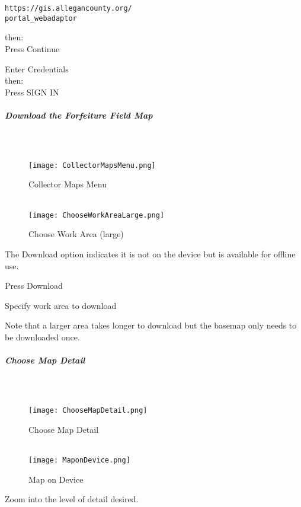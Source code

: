 \documentclass[class=article , crop=false, titlepage, twoside, multi={itemize, figure, verbatim}, float=false]{standalone}
\begin{document}
\begin{verbatim}
https://gis.allegancounty.org/
portal_webadaptor

\end{verbatim}

then:\\

Press \Large Continue

\vspace{3in}
Enter Credentials\\

then:\\

Press \Large SIGN IN
\clearpage
\subparagraph{Download the Forfeiture Field Map}

\subparagraph*{\\}
\begin{wrapfigure}{r}{0.5\textwidth}
\centering
\texttt{[image: CollectorMapsMenu.png]}
\caption{Collector Maps Menu}
\vspace{.25in}
\HRule \\[.4cm] %
\vspace{.25in}
\texttt{[image: ChooseWorkAreaLarge.png]}
\caption{Choose Work Area (large)}
\end{wrapfigure}
The Download option indicates it is not on the device but is available for offline use.
\vspace{.5in}

\noindent Press Download\\
\vspace{3in}

\noindent Specify work area to download\\
\vspace{.5in}

\noindent \footnotesize Note that a larger area takes longer to download but the basemap only needs to be downloaded once.
\clearpage
\subparagraph{Choose Map Detail}

\subparagraph*{\\}
\begin{wrapfigure}{r}{0.5\textwidth}
\centering
\texttt{[image: ChooseMapDetail.png]}
\caption{Choose Map Detail}
\vspace{.25in}
\HRule \\[.4cm] %
\vspace{.25in}
\texttt{[image: MaponDevice.png]}
\caption{Map on Device}
\end{wrapfigure}
Zoom into the level of detail desired.
\vspace{.5in}
\end{document}

